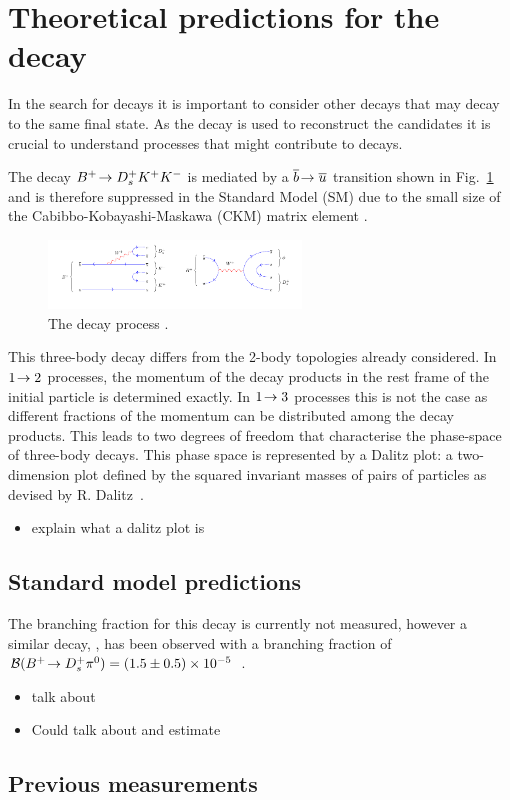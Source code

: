 \section{Theoretical predictions for the \decay{\Bp}{\Dsp\Kp\Km} decay}

In the search for \decay{\Bp}{\Dsp\phiz} decays it is important to consider other decays that may decay to the same final state. As the \decay{\phiz}{\Kp\Km} decay is used to reconstruct the \phiz candidates it is crucial to understand processes that might contribute to \decay{\Bp}{\Dsp\Kp\Km} decays. 

The decay ${{{B}^+}}\!\rightarrow {\ensuremath{{D}^+_{s}}}{\ensuremath{{K}^+}}{\ensuremath{{K}^-}}$ is mediated by a ${\overline {{b}}}\!\rightarrow {\ensuremath{\overline {{u}}}}$ transition shown in Fig.~\ref{fig:Theory_DsKKDiagram} and is therefore suppressed in the Standard Model (SM) due to the small size of the Cabibbo-Kobayashi-Maskawa (CKM) matrix element \Vub.
\begin{figure}[!h]
    \centering
    \includegraphics[width=0.6\textwidth]{figs/Theory/B2DsKK.pdf}
    \caption{The decay process \decay{\Bp}{\Dsp\Kp\Km}.}
    \label{fig:Theory_DsKKDiagram}   
\end{figure}

This three-body decay differs from the 2-body topologies already considered. In $1\!\rightarrow 2$ processes, the momentum of the decay products in the rest frame of the initial particle is determined exactly. In $1\!\rightarrow 3$ processes this is not the case as different fractions of the momentum can be distributed among the decay products. This leads to two degrees of freedom that characterise the phase-space of three-body decays. This phase space is represented by a Dalitz plot: a two-dimension plot defined by the squared invariant masses of pairs of particles as devised by R. Dalitz~\cite{PhysRev.94.1046}.


{\color{Red}
\begin{itemize}
\item explain what a dalitz plot is
\end{itemize}
}

\subsection{Standard model predictions}
{\color{Blue}
The branching fraction for this decay is currently not measured, however a similar decay, \decay{\Bp}{\Dsp \piz}, has been observed with a branching fraction of $\mathcal{B}({{{B}^+}}\!\rightarrow {\ensuremath{{D}^+_{s}}} {\ensuremath{{\pi}^0}}) = (1.5 \pm 0.5) \times 10^{-5}$~\cite{Aubert:2006xy}.
}


{\color{Red}
\begin{itemize}
\item talk about \decay{\Bp}{\Dsp\piz}
\item Could talk about \decay{\Bp}{\Dp\Kp\pim} and estimate   
\end{itemize}}

\subsection{Previous measurements}



